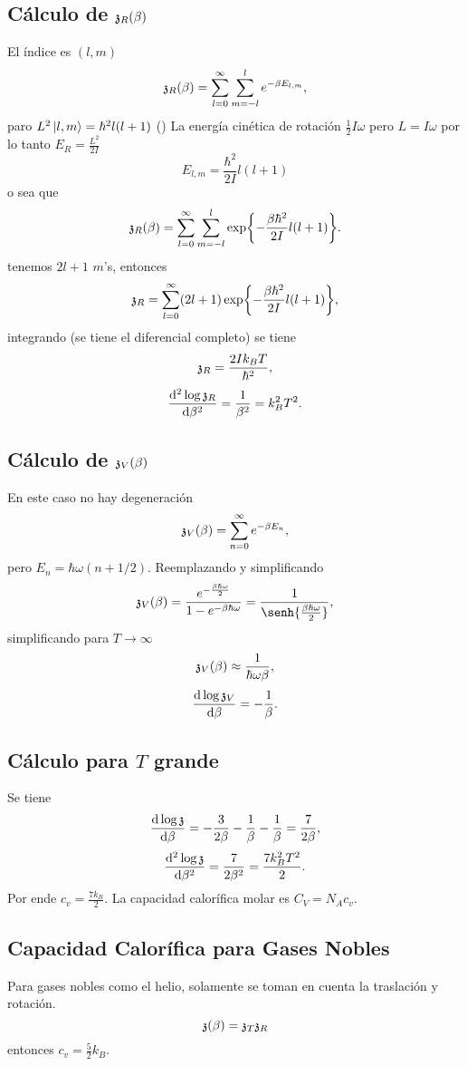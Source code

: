 \subsection{Cálculo de $\mathfrak{z} _R (\beta)$}
El índice es $(l,m)$
	$$ \mathfrak{z} _R (\beta) = \sum _{l=0} ^\infty \sum _{m= -l} ^l e^{-\beta E_{l,m}}, $$
paro $L^2 \ket{l,m} = \hbar ^2 l(l + 1)$ () La energía cinética de rotación $\frac{1}{2} I \omega$ pero $L = I \omega$ por lo tanto $E_R = \frac{L^2}{2I}$
	$$ E_{l,m} = \frac{\hbar ^2}{2I} l(l+1) $$
o sea que
	$$ \mathfrak{z} _R (\beta) = \sum _{l=0} ^\infty \sum _{m= -l} ^l \exp{-\frac{\beta \hbar ^2}{2I} l(l+1)}. $$
tenemos $2l+1$ $m$'s, entonces
	$$ \mathfrak{z} _R = \sum _{l=0} ^\infty (2l + 1) \exp{-\frac{\beta \hbar ^2}{2I} l(l+1)}, $$
integrando (se tiene el diferencial completo) se tiene
	$$ \mathfrak{z} _R = \frac{2I k_B T}{\hbar ^2}, $$
	$$ \dv[2]{\log{\mathfrak{z}_R}}{\beta} = \frac{1}{\beta ^2} = k_B ^2 T^2. $$


\subsection{Cálculo de $\mathfrak{z} _V (\beta)$}
En este caso no hay degeneración
	$$ \mathfrak{z} _V (\beta) = \sum _{n=0} ^\infty e^{-\beta E_n}, $$
pero $E_n = \hbar \omega (n + 1/2)$. Reemplazando y simplificando
	$$ \partition _V (\beta) = \frac{e^{-\frac{\beta \hbar \omega}{2}}}{1 - e^{-\beta \hbar \omega}} = \frac{1}{\senh{\frac{\beta \hbar \omega}{2}}}, $$
simplificando para $T \to \infty$
	$$ \mathfrak{z} _V (\beta) \approx \frac{1}{\hbar \omega \beta}, $$
	$$ \dv{\log{\mathfrak{z}_V}}{\beta} = -\frac{1}{\beta}. $$


\subsection{Cálculo para $T$ grande}
Se tiene
	$$ \dv{\log{\mathfrak{z}}}{\beta} = -\frac{3}{2\beta} - \frac{1}{\beta} - \frac{1}{\beta} = \frac{7}{2\beta}, $$
	$$ \dv[2]{\log{\mathfrak{z}}}{\beta} = \frac{7}{2\beta ^2} = \frac{7k_B ^2 T^2}{2}. $$
Por ende $c_v = \frac{7k_B}{2}$. La capacidad calorífica molar es $C_V = N_A c_v$.

\subsection{Capacidad Calorífica para Gases Nobles}
Para gases nobles como el helio, solamente se toman en cuenta la traslación y rotación.
	$$ \mathfrak{z} (\beta) = \mathfrak{z} _T \mathfrak{z} _R $$
entonces $c_v = \frac{5}{2} k_B$.
	
